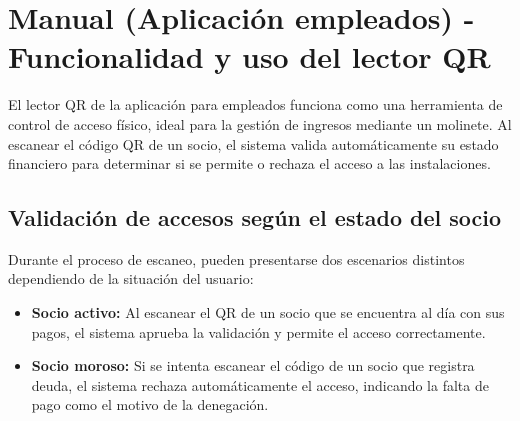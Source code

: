 \section{Manual (Aplicación empleados) - Funcionalidad y uso del lector QR}

El lector QR de la aplicación para empleados funciona como una herramienta de control de acceso físico, ideal para la gestión de ingresos mediante un molinete. Al escanear el código QR de un socio, el sistema valida automáticamente su estado financiero para determinar si se permite o rechaza el acceso a las instalaciones.

\subsection{Validación de accesos según el estado del socio}
Durante el proceso de escaneo, pueden presentarse dos escenarios distintos dependiendo de la situación del usuario:

\begin{itemize}
    \item \textbf{Socio activo:} Al escanear el QR de un socio que se encuentra al día con sus pagos, el sistema aprueba la validación y permite el acceso correctamente.
    \item \textbf{Socio moroso:} Si se intenta escanear el código de un socio que registra deuda, el sistema rechaza automáticamente el acceso, indicando la falta de pago como el motivo de la denegación.
\end{itemize}
